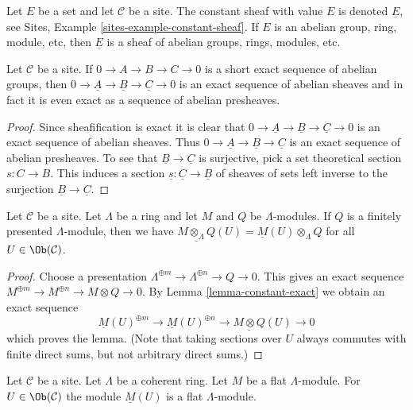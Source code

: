 \noindent
Let $E$ be a set and let $\mathcal{C}$ be a site. The constant
sheaf with value $E$ is denoted $\underline{E}$, see
Sites, Example \ref{sites-example-constant-sheaf}.
If $E$ is an abelian group, ring, module, etc,
then $\underline{E}$ is a sheaf of abelian groups, rings, modules, etc.

\begin{lemma}
\label{lemma-constant-exact}
Let $\mathcal{C}$ be a site. If $0 \to A \to B \to C \to 0$
is a short exact sequence of abelian groups, then
$0 \to \underline{A} \to \underline{B} \to \underline{C} \to 0$
is an exact sequence of abelian sheaves and in fact it is even
exact as a sequence of abelian presheaves.
\end{lemma}

\begin{proof}
Since sheafification is exact it is clear that
$0 \to \underline{A} \to \underline{B} \to \underline{C} \to 0$
is an exact sequence of abelian sheaves. Thus
$0 \to \underline{A} \to \underline{B} \to \underline{C}$
is an exact sequence of abelian presheaves. To see that
$\underline{B} \to \underline{C}$ is surjective, pick a
set theoretical section $s : C \to B$. This induces a
section $\underline{s} : \underline{C} \to \underline{B}$
of sheaves of sets left inverse to the surjection
$\underline{B} \to \underline{C}$.
\end{proof}

\begin{lemma}
\label{lemma-tensor-with-finitely-presented}
Let $\mathcal{C}$ be a site. Let $\Lambda$ be a ring and let $M$
and $Q$ be $\Lambda$-modules. If $Q$ is a finitely presented
$\Lambda$-module, then we have
$\underline{M \otimes_\Lambda Q}(U) = \underline{M}(U) \otimes_\Lambda Q$
for all $U \in \Ob(\mathcal{C})$.
\end{lemma}

\begin{proof}
Choose a presentation $\Lambda^{\oplus m} \to \Lambda^{\oplus n} \to Q \to 0$.
This gives an exact sequence
$M^{\oplus m} \to M^{\oplus n} \to M \otimes Q \to 0$.
By Lemma \ref{lemma-constant-exact} we obtain an exact sequence
$$
\underline{M}(U)^{\oplus m} \to
\underline{M}(U)^{\oplus n} \to
\underline{M \otimes Q}(U) \to 0
$$
which proves the lemma. (Note that taking sections over $U$ always
commutes with finite direct sums, but not arbitrary direct sums.)
\end{proof}

\begin{lemma}
\label{lemma-flat-sections}
Let $\mathcal{C}$ be a site. Let $\Lambda$ be a coherent ring.
Let $M$ be a flat $\Lambda$-module. For $U \in \Ob(\mathcal{C})$ the
module $\underline{M}(U)$ is a flat $\Lambda$-module.
\end{lemma}


